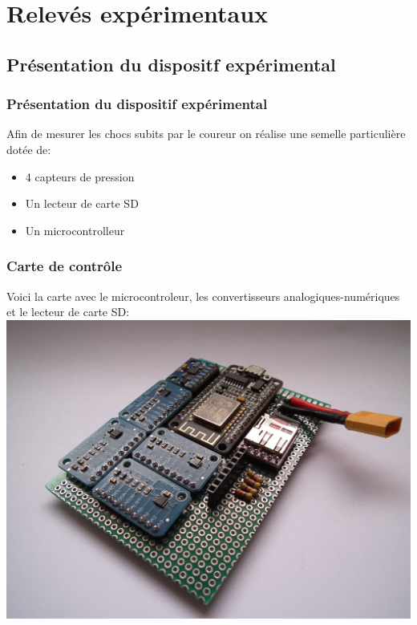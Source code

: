 \section{Relevés expérimentaux}
\subsection{Présentation du dispositf expérimental}
\begin{frame}
    \frametitle{Présentation du dispositif expérimental}
    Afin de mesurer les chocs subits par le coureur on réalise une semelle particulière dotée de:
    \begin{itemize}
        \item 4 capteurs de pression
        \item Un lecteur de carte SD
        \item Un microcontrolleur
    \end{itemize}
\end{frame}

\begin{frame}
    \frametitle{Carte de contrôle}
    Voici la carte avec le microcontroleur, les convertisseurs analogiques-numériques et le lecteur de carte SD:
    \includegraphics[width=\textwidth]{./figures/carte_00.jpg}

\end{frame}

